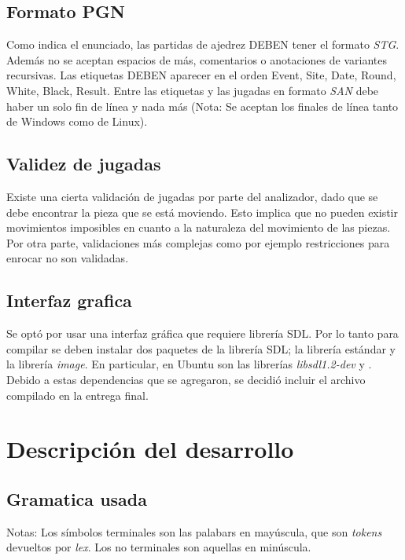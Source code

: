 \documentclass[a4paper,10pt]{article}
\begin{document}
\subsection{Formato PGN}

Como indica el enunciado, las partidas de ajedrez DEBEN tener el formato \textit{STG}. Además no se aceptan espacios de más, comentarios 
o anotaciones de variantes recursivas. Las etiquetas DEBEN aparecer en el orden Event, Site, Date, Round, White, Black, Result.
 Entre las etiquetas y las jugadas en formato \textit{SAN} debe haber un solo fin de línea y nada más (Nota: Se aceptan los finales de línea 
tanto de Windows como de Linux).

\subsection{ Validez de jugadas}

Existe una cierta validación de jugadas por parte del analizador, dado que se debe encontrar la pieza que se está moviendo. Esto implica que 
no pueden existir movimientos imposibles en cuanto a la naturaleza del movimiento de las piezas. Por otra parte, validaciones más complejas como 
por ejemplo restricciones para enrocar no son validadas.

\subsection{ Interfaz grafica}

Se optó por usar una interfaz gráfica que requiere librería SDL. Por lo tanto para compilar se deben instalar dos paquetes de la librería SDL; la librería 
estándar y la librería \textit{image}. En particular, en Ubuntu son las librerías \textit{libsdl1.2-dev} y . Debido a estas 
dependencias que se agregaron, se decidió incluir el archivo compilado en la entrega final.

\newpage

\section{Descripción del desarrollo}
  
\subsection{Gramatica usada}

Notas: Los símbolos terminales son las palabars en mayúscula, que son \textit{tokens} devueltos por \textit{lex}. Los no terminales 
son aquellas en minúscula.
\end{document}
